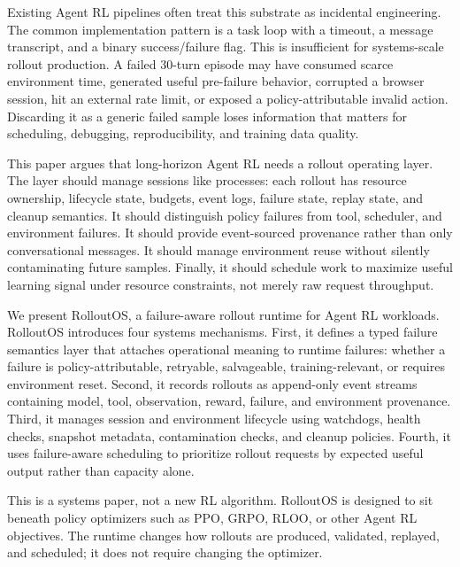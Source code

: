 \documentclass{article}
\newcommand{\sys}{RolloutOS}
\begin{document}
Existing Agent RL pipelines often treat this substrate as incidental engineering.
The common implementation pattern is a task loop with a timeout, a message transcript, and a binary success/failure flag.
This is insufficient for systems-scale rollout production.
A failed 30-turn episode may have consumed scarce environment time, generated useful pre-failure behavior, corrupted a browser session, hit an external rate limit, or exposed a policy-attributable invalid action.
Discarding it as a generic failed sample loses information that matters for scheduling, debugging, reproducibility, and training data quality.

This paper argues that long-horizon Agent RL needs a rollout operating layer.
The layer should manage sessions like processes: each rollout has resource ownership, lifecycle state, budgets, event logs, failure state, replay state, and cleanup semantics.
It should distinguish policy failures from tool, scheduler, and environment failures.
It should provide event-sourced provenance rather than only conversational messages.
It should manage environment reuse without silently contaminating future samples.
Finally, it should schedule work to maximize useful learning signal under resource constraints, not merely raw request throughput.

We present \sys, a failure-aware rollout runtime for Agent RL workloads.
\sys{} introduces four systems mechanisms.
First, it defines a typed failure semantics layer that attaches operational meaning to runtime failures: whether a failure is policy-attributable, retryable, salvageable, training-relevant, or requires environment reset.
Second, it records rollouts as append-only event streams containing model, tool, observation, reward, failure, and environment provenance.
Third, it manages session and environment lifecycle using watchdogs, health checks, snapshot metadata, contamination checks, and cleanup policies.
Fourth, it uses failure-aware scheduling to prioritize rollout requests by expected useful output rather than capacity alone.

This is a systems paper, not a new RL algorithm.
\sys{} is designed to sit beneath policy optimizers such as PPO, GRPO, RLOO, or other Agent RL objectives.
The runtime changes how rollouts are produced, validated, replayed, and scheduled; it does not require changing the optimizer.
\end{document}
